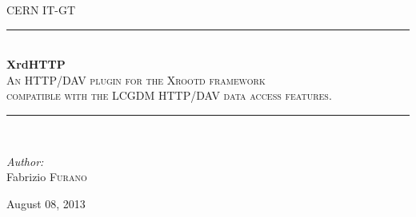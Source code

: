 \documentclass[12pt]{article} %
\begin{document}
\setcounter{secnumdepth}{3}
\setcounter{tocdepth}{3}


\begin{titlepage}

\newcommand{\HRule}{\rule{\linewidth}{0.5mm}} %

\center %

\textsc{\LARGE CERN IT-GT}\\[1.5cm] %

\HRule \\[0.4cm]
{ \huge \bfseries XrdHTTP}\\[0.4cm] %
\textsc{\Large An HTTP/DAV plugin for the Xrootd framework\\compatible with the LCGDM HTTP/DAV data access features.}\\[0.5cm]
\HRule \\[1.5cm]

\begin{minipage}{0.4\textwidth}
\begin{flushleft} \large
\emph{Author:}\\
Fabrizio \textsc{Furano} \\ %
\end{flushleft}
\end{minipage}


{\large August 08, 2013}\\[3cm] %


\vfill %

\end{titlepage}
\end{document}
